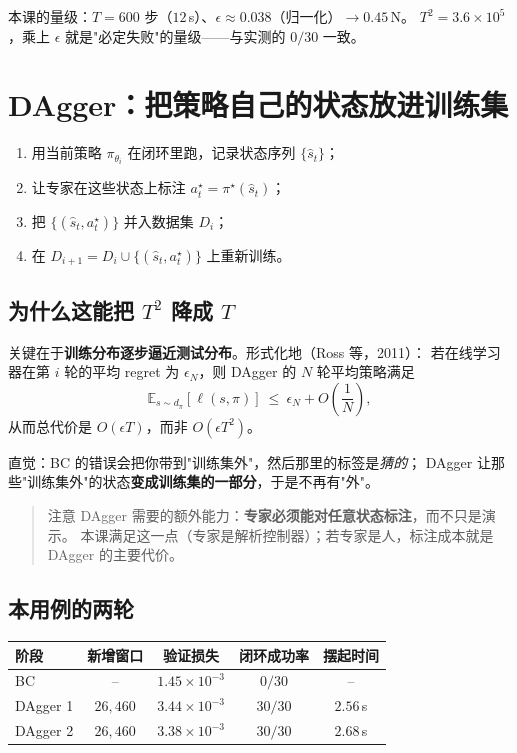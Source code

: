 本课的量级：$T=600$ 步（$12$\,s）、$\epsilon\approx0.038$（归一化）$\to0.45$\,N。
$T^2=3.6\times10^5$，乘上 $\epsilon$ 就是"必定失败"的量级——与实测的 $0/30$ 一致。

\section{DAgger：把策略自己的状态放进训练集}

\begin{enumerate}[leftmargin=2em,itemsep=3pt]
  \item 用当前策略 $\pi_{\theta_i}$ 在闭环里跑，记录状态序列 $\{\hat s_t\}$；
  \item 让专家在这些状态上标注 $a^\star_t=\pi^\star(\hat s_t)$；
  \item 把 $\{(\hat s_t,a^\star_t)\}$ 并入数据集 $D_i$；
  \item 在 $D_{i+1}=D_i\cup\{(\hat s_t,a^\star_t)\}$ 上重新训练。
\end{enumerate}

\subsection{为什么这能把 $T^2$ 降成 $T$}

关键在于\textbf{训练分布逐步逼近测试分布}。形式化地（Ross 等，2011）：
若在线学习器在第 $i$ 轮的平均 regret 为 $\epsilon_N$，则 DAgger 的 $N$ 轮平均策略满足
\begin{equation}
  \mathbb{E}_{s\sim d_{\pi}}[\ell(s,\pi)]\ \le\ \epsilon_N
  + O\!\left(\frac{1}{N}\right),
  \label{eq:noregret}
\end{equation}
从而总代价是 $O(\epsilon T)$，而非 $O(\epsilon T^2)$。

直觉：BC 的错误会把你带到"训练集外"，然后那里的标签是\emph{猜的}；
DAgger 让那些"训练集外"的状态\textbf{变成训练集的一部分}，于是不再有"外"。

\begin{quote}
注意 DAgger 需要的额外能力：\textbf{专家必须能对任意状态标注}，而不只是演示。
本课满足这一点（专家是解析控制器）；若专家是人，标注成本就是 DAgger 的主要代价。
\end{quote}

\subsection{本用例的两轮}

\begin{center}
\small
\begin{tabular}{@{}lcccc@{}}
\toprule
阶段 & 新增窗口 & 验证损失 & 闭环成功率 & 摆起时间 \\
\midrule
BC & -- & $1.45\times10^{-3}$ & $0/30$ & -- \\
DAgger 1 & $26{,}460$ & $3.44\times10^{-3}$ & $30/30$ & $2.56$\,s \\
DAgger 2 & $26{,}460$ & $3.38\times10^{-3}$ & $30/30$ & $2.68$\,s \\
\bottomrule
\end{tabular}
\end{center}

